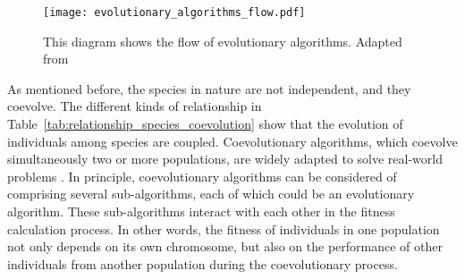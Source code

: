 \begin{figure}[htbp]
  \centering
  \texttt{[image: evolutionary\_algorithms\_flow.pdf]}
  \caption{This diagram shows the flow of evolutionary algorithms. Adapted from \cite{Eiben:Nature:2015}}
  \label{fig:evolutionary_algorithms_flow}
\end{figure}

As mentioned before, the species in nature are not independent, and they coevolve. The different kinds of relationship in Table~\ref{tab:relationship_species_coevolution} show that the evolution of individuals among species are coupled. Coevolutionary algorithms, which coevolve simultaneously two or more populations, are widely adapted to solve real-world problems \cite{Rosin_1997, Bongard2005, Zhou2006, tan2006coevolutionary}. In principle, coevolutionary algorithms can be considered of comprising several sub-algorithms, each of which could be an evolutionary algorithm. These sub-algorithms interact with each other in the fitness calculation process. In other words, the fitness of individuals in one population not only depends on its own chromosome, but also on the performance of other individuals from another population during the coevolutionary process. 


